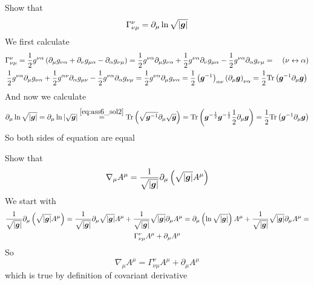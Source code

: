 Show that 
%
\begin{equation}
    \Gamma_{\nu\mu}^\nu = \partial_\mu \ln \sqrt{|\boldsymbol{g}|}
\end{equation}
%
We first calculate
%
\begin{multline}
    \Gamma_{\nu\mu}^\nu = \frac{1}{2}g^{\nu\alpha}\left(
        \partial_\mu g_{\nu\alpha} +
        \partial_\nu g_{\mu\alpha} - 
        \partial_\alpha g_{\nu\mu}
    \right)=
    \frac{1}{2}g^{\nu\alpha}\partial_\mu g_{\nu\alpha} +
    \frac{1}{2}g^{\nu\alpha}\partial_\nu g_{\mu\alpha} - 
    \frac{1}{2}g^{\nu\alpha}\partial_\alpha g_{\nu\mu} = \quad (\nu \leftrightarrow \alpha) \\
    \frac{1}{2}g^{\nu\alpha}\partial_\mu g_{\nu\alpha} +
    \frac{1}{2}g^{\alpha\nu}\partial_\alpha g_{\mu\nu} - 
    \frac{1}{2}g^{\nu\alpha}\partial_\alpha g_{\nu\mu} =
    \frac{1}{2}g^{\nu\alpha}\partial_\mu g_{\nu\alpha} =
    \frac{1}{2}\left(\boldsymbol{g}^{-1}\right)_{\alpha\nu}\left(\partial_\mu \boldsymbol{g}\right)_{\nu\alpha} =
    \frac{1}{2}\text{Tr}\left(\boldsymbol{g}^{-1}\partial_\mu\boldsymbol{g}\right)
\end{multline}
%
And now we calculate 
%
\begin{equation}
    \partial_\mu \ln \sqrt{|\bs{g}|} = 
    \partial_\mu \ln |\sqrt{\bs{g}}|\stackrel{\cref{eq:ass6_sol2}}{=} 
    \text{Tr}\left(\sqrt{\bs{g}^{-1}}\partial_\mu \sqrt{\bs{g}}\right) =
    \text{Tr}\left(\bs{g}^{-\frac{1}{2}}\bs{g}^{-\frac{1}{2}}\frac{1}{2}\partial_\mu\bs{g}\right) =
    \frac{1}{2}\text{Tr}\left(\bs{g}^{-1}\partial_\mu\bs{g}\right)
\end{equation}
%
So both sides of equation are equal

\problem

Show that
%
\begin{equation}
    \nabla_\mu A^\mu = \frac{1}{\sqrt{|\boldsymbol{g}|}}\partial_\mu
    \left(\sqrt{|\boldsymbol{g}|}A^\mu\right) 
\end{equation}
%
We start with 
%
\begin{multline}
    \frac{1}{\sqrt{|\boldsymbol{g}|}}\partial_\mu
    \left(\sqrt{|\boldsymbol{g}|}A^\mu\right) = 
    \frac{1}{\sqrt{|\boldsymbol{g}|}}
    \partial_\mu\sqrt{|\boldsymbol{g}|}
    A^\mu +
    \frac{1}{\sqrt{|\boldsymbol{g}|}}
    \sqrt{|\boldsymbol{g}|}
    \partial_\mu A^\mu =
    \partial_\mu\left(\ln\sqrt{|\boldsymbol{g}|}\right)
    A^\mu +
    \frac{1}{\sqrt{|\boldsymbol{g}|}}
    \sqrt{|\boldsymbol{g}|}
    \partial_\mu A^\mu =\\
    \Gamma_{\nu\mu}^\nu A^\mu + 
    \partial_\mu A^\mu
\end{multline}
%
So 
%
\begin{equation}
    \nabla_\mu A^\mu =
    \Gamma_{\nu\mu}^\nu A^\mu + 
    \partial_\mu A^\mu
\end{equation}
%
which is true by definition of covariant derivative

